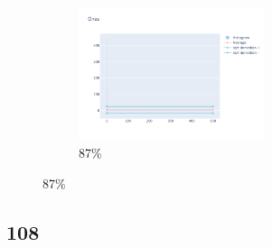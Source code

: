 \documentclass[12pt, fleqn]{report}                             %
\theoremstyle{break}                                            %
\begin{document}
\begin{figure}[ht!]
\begin{subfigure}[b]{0.4\linewidth}
          \includegraphics[width=0.6\textwidth]{Images/104/dia-d.png}
          \caption{87\%}
        \end{subfigure}
      \end{figure}


      \clearpage
      \subsection{108}
\end{document}
